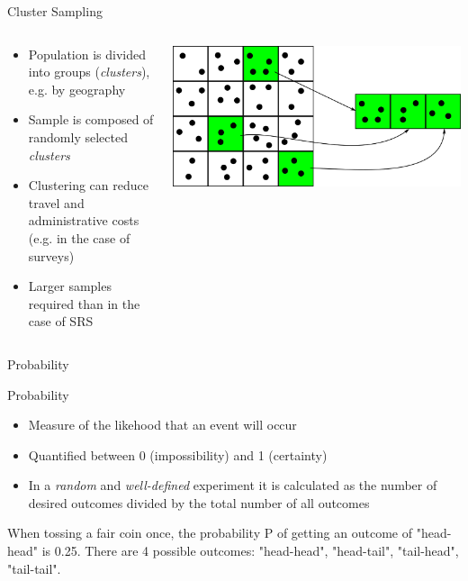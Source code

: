 \begin{frame}{Cluster Sampling}

\begin{columns}
    \begin{column}{0.5\textwidth}
        \begin{itemize}
            \item Population is divided into groups (\textit{clusters}), e.g. by geography
            \item Sample is composed of randomly selected \textit{clusters}
            \item Clustering can reduce travel and administrative costs (e.g. in the case of surveys)
            \item Larger samples required than in the case of SRS
        \end{itemize}
    \end{column}
    \begin{column}{0.5\textwidth}
        \includegraphics[width=\textwidth]{gfx/cluster_sampling}
    \end{column}
\end{columns}

\end{frame}

\begin{frame}{Probability}

    \begin{block}{Probability}
        \begin{itemize}
            \item Measure of the likehood that an event will occur
            \item Quantified between 0 (impossibility) and 1 (certainty)
            \item In a \emph{random} and \emph{well-defined} experiment it is calculated as the number of desired outcomes divided by the total number of all outcomes
        \end{itemize}
    \end{block}
    
    \begin{example}
        \smallskip
        When tossing a fair coin once, the probability P of getting an outcome of "head-head" is 0.25. There are 4 possible outcomes: "head-head", "head-tail", "tail-head", "tail-tail".
    \end{example}

\end{frame}

